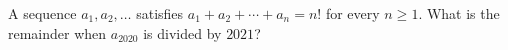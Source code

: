 A sequence $a_1,a_2,\dots$ satisfies $a_1+a_2+\cdots+a_n=n!$ for every $n\ge1$. What is the remainder when $a_{2020}$ is divided by $2021$?
